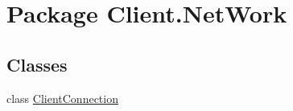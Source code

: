 \hypertarget{namespaceClient_1_1NetWork}{}\section{Package Client.\+Net\+Work}
\label{namespaceClient_1_1NetWork}
\subsection*{Classes}
\begin{DoxyCompactItemize}
\item 
class \mbox{\hyperlink{classClient_1_1NetWork_1_1ClientConnection}{Client\+Connection}}
\end{DoxyCompactItemize}

